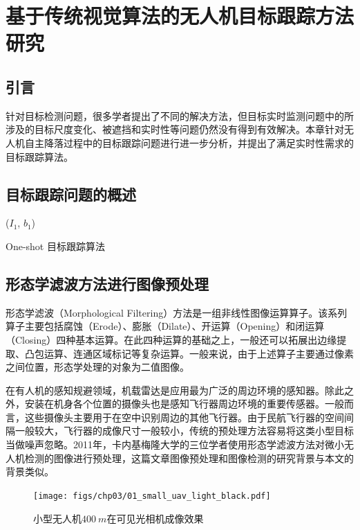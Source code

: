 \chapter{基于传统视觉算法的无人机目标跟踪方法研究}


\section{引言}
针对目标检测问题，很多学者提出了不同的解决方法，但目标实时监测问题中的所涉及的目标尺度变化、被遮挡和实时性等问题仍然没有得到有效解决。本章针对无人机自主降落过程中的目标跟踪问题进行进一步分析，并提出了满足实时性需求的目标跟踪算法。

\section{目标跟踪问题的概述}

\begin{algorithm2e}[H]
	\SetAlgoLined
	\BlankLine
	\Initialization($I_1$, $b_1$)\;
	\caption{One-shot 目标跟踪算法}
\end{algorithm2e}


\section{形态学滤波方法进行图像预处理}

形态学滤波（Morphological Filtering）方法是一组非线性图像运算算子。该系列算子主要包括腐蚀（Erode）、膨胀（Dilate）、开运算（Opening）和闭运算（Closing）四种基本运算。在此四种运算的基础之上，一般还可以拓展出边缘提取、凸包运算、连通区域标记等复杂运算。一般来说，由于上述算子主要通过像素之间位置，形态学处理的对象为二值图像。

在有人机的感知规避领域，机载雷达是应用最为广泛的周边环境的感知器。除此之外，安装在机身各个位置的摄像头也是感知飞行器周边环境的重要传感器。一般而言，这些摄像头主要用于在空中识别周边的其他飞行器。由于民航飞行器的空间间隔一般较大，飞行器的成像尺寸一般较小，传统的预处理方法容易将这类小型目标当做噪声忽略。2011年，卡内基梅隆大学的三位学者使用形态学滤波方法对微小无人机检测的图像进行预处理\cite{dey2011cascaded}，这篇文章图像预处理和图像检测的研究背景与本文的背景类似。
\begin{figure}[htb]   
	\centering
	\texttt{[image: figs/chp03/01\_small\_uav\_light\_black.pdf]}
	\caption{小型无人机$400\ m$在可见光相机成像效果}
	\label{fig:01_small_uav_light_black}
\end{figure}

